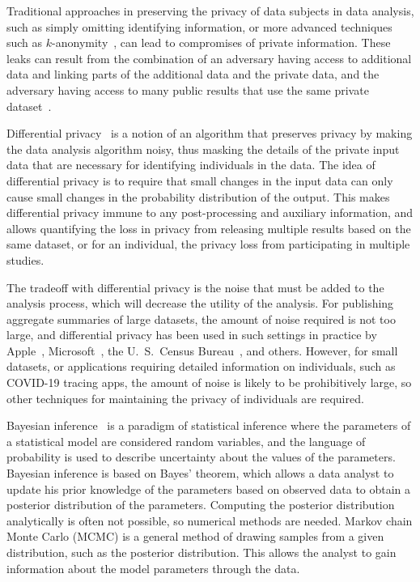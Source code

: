 \documentclass[english,twoside,openright]{HYgraduMLDS}
\begin{document}
Traditional approaches in preserving the privacy of data subjects in data
analysis, such as simply omitting identifying information, or
more advanced techniques such as \(k\)-anonymity~\cite{Sam01},
can lead to compromises of private information. These leaks can result from
the combination of an
adversary having access to additional data and linking parts of the additional
data and the private data, and the adversary having access to many
public results that use the same private dataset~\cite{DiN03}.

Differential privacy~\cite{DMN06} is a notion of an algorithm that preserves
privacy by making the data analysis algorithm noisy, thus masking the details of
the private input data that are necessary for identifying individuals in the data.
The idea of differential privacy is to require that small changes in the input
data can only cause small changes in the probability distribution of the
output. This makes differential privacy immune to any post-processing and
auxiliary information, and allows quantifying the loss in privacy from releasing
multiple results based on the same dataset, or for an individual, the privacy
loss from participating in multiple studies.

The tradeoff with differential privacy is the noise that must be added to the
analysis process, which will decrease the utility of the analysis. For publishing
aggregate summaries of large datasets, the amount of noise required is not too
large, and differential privacy has been used in such settings in practice by
Apple~\cite{App17}, Microsoft~\cite{DKY17}, the U.\ S.\ Census Bureau~\cite{Abo18},
and others. However, for small datasets, or applications requiring detailed
information on individuals, such as COVID-19 tracing apps, the amount of
noise is likely to be prohibitively large, so other techniques for maintaining
the privacy of individuals are required.

Bayesian inference~\cite{BDA} is a paradigm of statistical inference where
the parameters of a statistical model are considered random variables, and
the language of probability is used to describe uncertainty about the values of the
parameters. Bayesian inference is based on Bayes' theorem, which allows
a data analyst to update his prior knowledge of the parameters based on observed
data to obtain a posterior distribution of the parameters.
Computing the posterior distribution analytically is often not possible,
so numerical methods are needed. Markov chain Monte Carlo (MCMC) is a general
method of drawing
samples from a given distribution, such as the posterior distribution. This allows
the analyst to gain information about the model parameters through the data.
\end{document}
